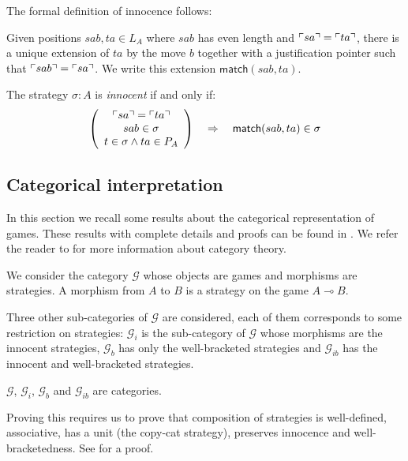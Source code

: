 The formal definition of innocence follows:
\begin{dfn}[Innocence]
Given positions $sab, ta \in L_A$ where $sab$ has even length and
$\ulcorner sa \urcorner = \ulcorner ta \urcorner$, there is a unique extension of $ta$ by
the move $b$ together with a justification pointer such that
$\ulcorner sab \urcorner = \ulcorner sa \urcorner$. We write this extension
$\textsf{match}(sab,ta)$.

The strategy $\sigma:A$ is \emph{innocent} if and only if:
$$ \left(
     \begin{array}{c}
       \ulcorner sa \urcorner = \ulcorner ta \urcorner \\
       sab \in \sigma \\
       t\in \sigma \wedge ta \in P_A \\
     \end{array}
   \right)
\quad \Rightarrow\quad  \textsf{match}(sab,ta) \in \sigma$$

\end{dfn}


\subsection{Categorical interpretation}

In this section we recall some results about the categorical
representation of games. These results with complete details and
proofs can be found in \cite{McC96b,hylandong_pcf,abramsky94full}.
We refer the reader to \cite{CroleRL:catt} for more information
about category theory.

We consider the category $\mathcal{G}$ whose objects are games and morphisms are
strategies. A morphism from $A$ to $B$ is a strategy on the game $A \multimap B$.

Three other sub-categories of $\mathcal{G}$ are considered, each of
them corresponds to some restriction on strategies: $\mathcal{G}_i$
is the sub-category of $\mathcal{G}$ whose morphisms are the
innocent strategies, $\mathcal{G}_b$ has only the well-bracketed
strategies and $\mathcal{G}_{ib}$ has the innocent and
well-bracketed strategies.

\begin{prop}
$\mathcal{G}$, $\mathcal{G}_i$, $\mathcal{G}_b$ and $\mathcal{G}_{ib}$ are categories.
\end{prop}

Proving this requires us to prove that composition of strategies is
well-defined, associative, has a unit (the copy-cat strategy),
preserves innocence and well-bracketedness. See
\cite{hylandong_pcf,abramsky94full} for a proof.



